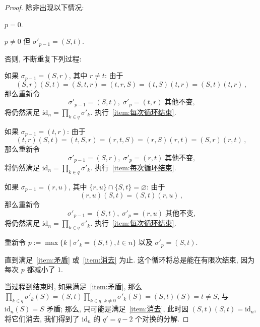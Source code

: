 \documentclass[openany]{ctexbook}
\theoremstyle{plain}
\theoremstyle{definition}
\newcommand*{\id}{\mathrm{id}} %
\begin{document}
\begin{proof}
	除非出现以下情况:
	\begin{conditionlist}[label=\alph*)]
		\item $p = 0$. \label{item:矛盾}
		\item $p \neq 0$ 但 $\sigma'_{p - 1} = (S, t)$. \label{item:消去}
	\end{conditionlist}
	否则, 不断重复下列过程:
	\begin{conditionlist}[label=\arabic*)]
		\item 如果 $\sigma_{p - 1} = (S, r)$, 其中 $r \neq t$:
			由于
			\begin{equation*}
				(S, r)(S, t) = (S, t, r) = (t, r, S) 
				= (t, S)(t, r) = (S, t)(t, r)\,,
			\end{equation*}
			那么重新令
			\begin{equation*}
				\sigma'_{p - 1} = (S, t),\; 
				\sigma'_p = (t, r)\;
				\text{其他不变,} 
			\end{equation*}
			将仍然满足 $\id_n = \prod_{k \in q} \sigma'_k$. 
			执行~\ref{item:每次循环结束}. 
		\item 如果 $\sigma_{p - 1} = (t, r)$:
			由于
			\begin{equation*}
				(t, r)(S, t) = (t, S, r) = (r, t, S) 
				= (r, S)(r, t) = (S, r)(r, t)\,,
			\end{equation*}
			那么重新令
			\begin{equation*}
				\sigma'_{p - 1} = (S, r),\; 
				\sigma'_p = (r, t)\;
				\text{其他不变,} 
			\end{equation*}
			将仍然满足 $\id_n = \prod_{k \in q} \sigma'_k$. 
			执行~\ref{item:每次循环结束}. 
		\item 如果 $\sigma_{p - 1} = (r, u)$, 其中 $\{r, u\} \cap \{S, t\} = \varnothing$:
			由于
			\begin{equation*}
				(r, u)(S, t) = (S, t)(r, u)\,,
			\end{equation*}
			那么重新令
			\begin{equation*}
				\sigma'_{p - 1} = (S, t),\; 
				\sigma'_p = (r, u)\;
				\text{其他不变,} 
			\end{equation*}
			将仍然满足 $\id_n = \prod_{k \in q} \sigma'_k$. 
			执行~\ref{item:每次循环结束}. 
		\item 重新令 $p := \max\{ k \mid \sigma'_k = (S,t), t\in n\}$ 以及 $\sigma'_p = (S, t)$. \label{item:每次循环结束}
	\end{conditionlist}
	直到满足~\ref{item:矛盾} 或~\ref{item:消去} 为止. 
	这个循环将总是能在有限次结束, 因为每次 $p$ 都减小了 $1$.

	当过程到结束时, 如果满足~\ref{item:矛盾}, 那么 $\prod_{k \in q} \sigma'_k (S)= (S, t) \prod_{k \in q, \, k \neq 0} \sigma'_k(S) = (S, t)(S) = t \neq S$, 与 $\id_n(S) = S$ 矛盾; 
	那么, 只可能是满足~\ref{item:消去}, 此时因 $(S, t)(S, t) = \id_n$, 将它们消去, 我们得到了 $\id_n$ 的 $q' = q - 2$ 个对换的分解. 
	

\end{proof}
\end{document}
